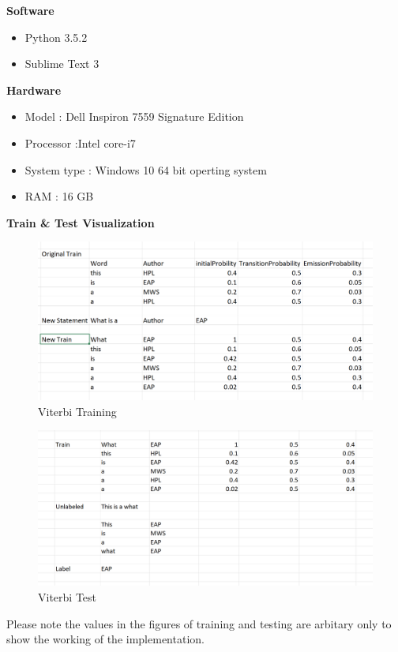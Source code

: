 \documentclass[fleqn,10pt]{SelfArx} %
\begin{document}
\textbf{Software}
\begin{itemize}[noitemsep]
	\item Python 3.5.2
	\item Sublime Text 3
\end{itemize}
\textbf{Hardware}
\begin{itemize}[noitemsep]
	\item Model : Dell Inspiron 7559 Signature Edition
	\item Processor :Intel core-i7
	\item System type : Windows 10 64 bit operting system
	\item RAM : 16 GB
\end{itemize}
\textbf{Train \& Test Visualization}\\
\begin{figure}[H]\centering
	\includegraphics[width=\linewidth]{ViterbiTrain.png}
	\caption{Viterbi Training}
	\label{fig:Viterbi Training}
\end{figure}
\begin{figure}[H]\centering
	\includegraphics[width=\linewidth]{ViterbiTest.png}
	\caption{Viterbi Test}
	\label{fig:Viterbi Test}
\end{figure}
Please note the values in the figures of training and testing are arbitary only to show the working of the implementation.\\
\end{document}
